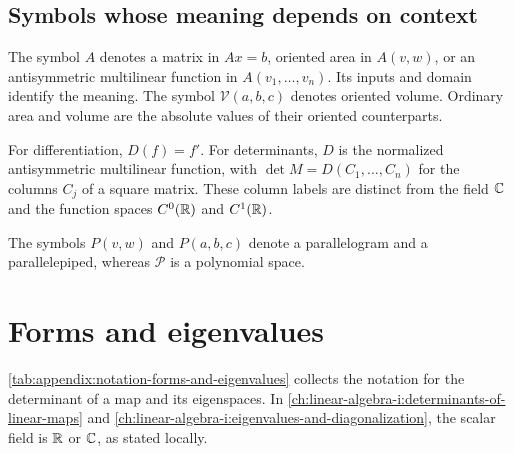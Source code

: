 \subsection{Symbols whose meaning depends on context}

The symbol \(A\) denotes a matrix in \(Ax=b\), oriented area in
\(A(v,w)\), or an antisymmetric multilinear function in
\(A(v_1,\ldots,v_n)\). Its inputs and domain identify the meaning.
The symbol \(\mathcal V(a,b,c)\) denotes oriented volume. Ordinary area
and volume are the absolute values of their oriented counterparts.

For differentiation, \(D(f)=f'\). For determinants, \(D\) is the
normalized antisymmetric multilinear function, with
\(\det M=D(C_1,\ldots,C_n)\) for the columns \(C_j\) of a square matrix.
These column labels are distinct from the field \(\mathbb{C}\) and the function
spaces \(C^0(\mathbb{R})\) and \(C^1(\mathbb{R})\).

The symbols \(P(v,w)\) and \(P(a,b,c)\) denote a parallelogram and a
parallelepiped, whereas \(\mathcal P\) is a polynomial space.

\section{Forms and eigenvalues}
\label{sec:appendix:notation-forms-and-eigenvalues}

\autoref{tab:appendix:notation-forms-and-eigenvalues} collects the notation
for the determinant of a map and its eigenspaces. In
\autoref{ch:linear-algebra-i:determinants-of-linear-maps} and
\autoref{ch:linear-algebra-i:eigenvalues-and-diagonalization}, the scalar
field is \(\mathbb{R}\) or \(\mathbb{C}\), as stated locally.

